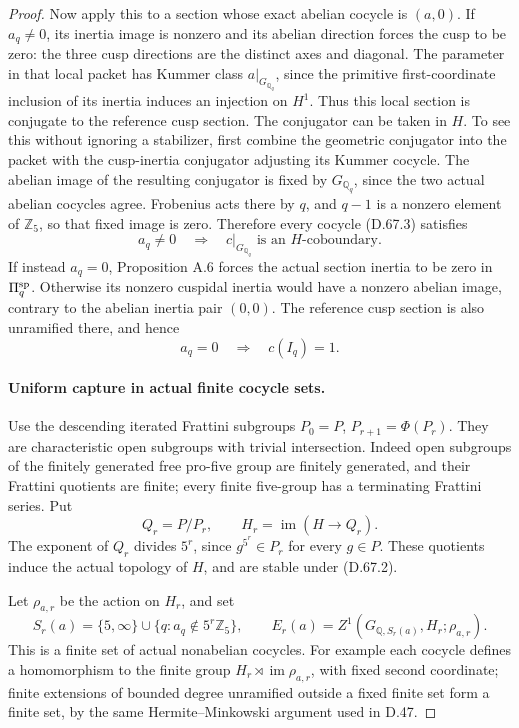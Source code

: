 \begin{proof}
Now apply this to a section whose exact abelian
cocycle is \((a,0)\). If \(a_q\ne0\), its
inertia image is nonzero and its abelian direction
forces the cusp to be zero: the three cusp
directions are the distinct axes and diagonal.
The parameter in that local packet has Kummer
class \(a|_{G_{\mathbb Q_q}}\), since the primitive
first-coordinate inclusion of its inertia induces
an injection on \(H^1\). Thus this local section
is conjugate to the reference cusp section. The
conjugator can be taken in \(H\). To see this
without ignoring a stabilizer, first combine the
geometric conjugator into the packet with the
cusp-inertia conjugator adjusting its Kummer
cocycle. The abelian image of the resulting
conjugator is fixed by \(G_{\mathbb Q_q}\), since
the two actual abelian cocycles agree. Frobenius
acts there by \(q\), and \(q-1\) is a nonzero
element of \(\mathbb Z_5\), so that fixed image
is zero. Therefore every cocycle (D.67.3) satisfies
\[
 a_q\ne0\quad\Longrightarrow\quad
 c|_{G_{\mathbb Q_q}}\text{ is an }H\text{-coboundary}.
                                                        \tag{D.67.5}
\]
If instead \(a_q=0\), Proposition A.6 forces
the actual section inertia to be zero in
\(\Pi_q^{\rm sp}\). Otherwise its nonzero
cuspidal inertia would have a nonzero abelian
image, contrary to the abelian inertia pair
\((0,0)\). The reference cusp section is also
unramified there, and hence
\[
                   a_q=0\quad\Longrightarrow\quad
                           c(I_q)=1.                   \tag{D.67.6}
\]

\paragraph{Uniform capture in actual finite cocycle sets.}
Use the descending iterated Frattini subgroups
\(P_0=P\), \(P_{r+1}=\Phi(P_r)\). They are
characteristic open subgroups with trivial
intersection. Indeed open subgroups of the
finitely generated free pro-five group are
finitely generated, and their Frattini quotients
are finite; every finite five-group has a
terminating Frattini series. Put
\[
       Q_r=P/P_r,\qquad H_r=\operatorname{im}(H\to Q_r).
                                                        \tag{D.67.7}
\]
The exponent of \(Q_r\) divides \(5^r\), since
\(g^{5^r}\in P_r\) for every \(g\in P\).
These quotients induce the actual topology of
\(H\), and are stable under (D.67.2).

Let \(\rho_{a,r}\) be the action on \(H_r\), and set
\[
 S_r(a)=\{5,\infty\}\cup\{q:a_q\notin5^r\mathbb Z_5\},
 \qquad E_r(a)=Z^1(G_{\mathbb Q,S_r(a)},H_r;\rho_{a,r}).
                                                        \tag{D.67.8}
\]
This is a finite set of actual nonabelian
cocycles. For example each cocycle defines a
homomorphism to the finite group
\(H_r\rtimes\operatorname{im}\rho_{a,r}\), with
fixed second coordinate; finite extensions of
bounded degree unramified outside a fixed
finite set form a finite set, by the same
Hermite--Minkowski argument used in D.47.


\end{proof}
